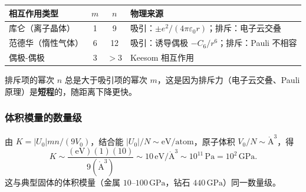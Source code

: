 \begin{center}
\renewcommand{\arraystretch}{1.5}
\begin{tabular}{|l|c|c|l|}
\hline
\textbf{相互作用类型} & $m$ & $n$ & \textbf{物理来源} \\
\hline
库仑（离子晶体） & 1 & 9 & 吸引：$\pm e^2/(4\pi\varepsilon_0 r)$；排斥：电子云交叠 \\
范德华（惰性气体） & 6 & 12 & 吸引：诱导偶极 $-C_6/r^6$；排斥：Pauli 不相容 \\
偶极-偶极 & 3 & $>3$ & Keesom 相互作用 \\
\hline
\end{tabular}
\end{center}

排斥项的幂次 $n$ 总是大于吸引项的幂次 $m$，这是因为排斥力（电子云交叠、Pauli 原理）是\textbf{短程}的，随距离下降更快。

\subsubsection{体积模量的数量级}

由 $K = |U_0|mn/(9V_0)$，结合能 $|U_0|/N \sim \text{eV/atom}$，原子体积 $V_0/N \sim \mathring{\mathrm{A}}^3$，得
\[
  K \sim \frac{(\text{eV})(1)(10)}{9(\mathring{\mathrm{A}}^3)} \sim 10\,\text{eV}/\mathring{\mathrm{A}}^3 \sim 10^{11}\,\text{Pa} = 10^2\,\text{GPa}.
\]
这与典型固体的体积模量（金属 $10$–$100\,\text{GPa}$，钻石 $440\,\text{GPa}$）同一数量级。
